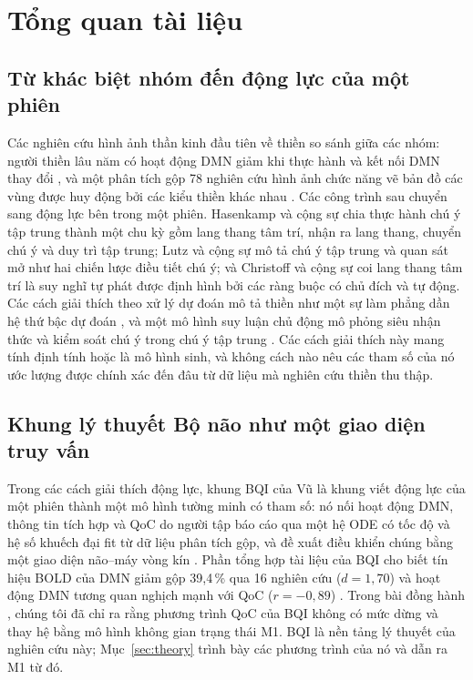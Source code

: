 \section{Tổng quan tài liệu}
\label{sec:litreview}

\subsection{Từ khác biệt nhóm đến động lực của một phiên}
Các nghiên cứu hình ảnh thần kinh đầu tiên về thiền so sánh giữa các nhóm: người thiền lâu năm có hoạt động DMN giảm khi thực hành và kết nối DMN thay đổi \cite{Brewer2011,Garrison2015}, và một phân tích gộp 78 nghiên cứu hình ảnh chức năng vẽ bản đồ các vùng được huy động bởi các kiểu thiền khác nhau \cite{Fox2016}. Các công trình sau chuyển sang động lực bên trong một phiên. Hasenkamp và cộng sự \cite{Hasenkamp2012} chia thực hành chú ý tập trung thành một chu kỳ gồm lang thang tâm trí, nhận ra lang thang, chuyển chú ý và duy trì tập trung; Lutz và cộng sự \cite{Lutz2008} mô tả chú ý tập trung và quan sát mở như hai chiến lược điều tiết chú ý; và Christoff và cộng sự \cite{Christoff2016} coi lang thang tâm trí là suy nghĩ tự phát được định hình bởi các ràng buộc có chủ đích và tự động. Các cách giải thích theo xử lý dự đoán mô tả thiền như một sự làm phẳng dần hệ thứ bậc dự đoán \cite{Laukkonen2021}, và một mô hình suy luận chủ động mô phỏng siêu nhận thức và kiểm soát chú ý trong chú ý tập trung \cite{SandvedSmith2021}. Các cách giải thích này mang tính định tính hoặc là mô hình sinh, và không cách nào nêu các tham số của nó ước lượng được chính xác đến đâu từ dữ liệu mà nghiên cứu thiền thu thập.

\subsection{Khung lý thuyết Bộ não như một giao diện truy vấn}
Trong các cách giải thích động lực, khung BQI của Vũ \cite{BQI} là khung viết động lực của một phiên thành một mô hình tường minh có tham số: nó nối hoạt động DMN, thông tin tích hợp và QoC do người tập báo cáo qua một hệ ODE có tốc độ và hệ số khuếch đại fit từ dữ liệu phân tích gộp, và đề xuất điều khiển chúng bằng một giao diện não--máy vòng kín \cite[Mục~7, 9 và 10]{BQI}. Phần tổng hợp tài liệu của BQI cho biết tín hiệu BOLD của DMN giảm gộp 39,4\,\% qua 16 nghiên cứu ($d=1{,}70$) và hoạt động DMN tương quan nghịch mạnh với QoC ($r=-0{,}89$) \cite[Mục~7.3--7.4]{BQI}. Trong bài đồng hành \cite{companion}, chúng tôi đã chỉ ra rằng phương trình QoC của BQI không có mức dừng và thay hệ bằng mô hình không gian trạng thái M1. BQI là nền tảng lý thuyết của nghiên cứu này; Mục~\ref{sec:theory} trình bày các phương trình của nó và dẫn ra M1 từ đó.

